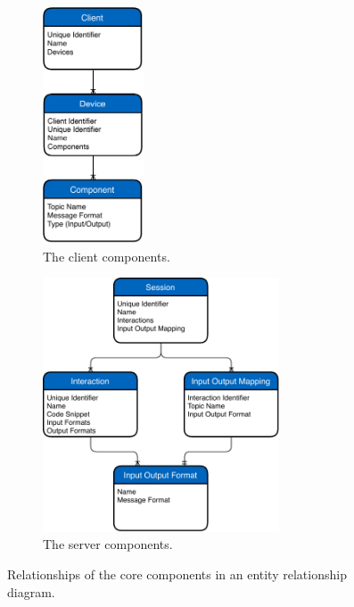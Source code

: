 \begin{figure}[htpb]
  \centering
  \begin{subfigure}{.5\textwidth}
    \centering
    \includegraphics[width=3cm]{figures/ubii_er_client.pdf}
    \caption{The client components.}
    \label{fig:ubii_er_client}
  \end{subfigure}%
  \begin{subfigure}{.5\textwidth}
    \centering
    \includegraphics[width=7cm]{figures/ubii_er_server.pdf}
    \caption{The server components.}
    \label{fig:ubii_er_server}
  \end{subfigure}
  \caption{Relationships of the core components in an entity relationship diagram.}
  \label{fig:ubii_er}
\end{figure}



